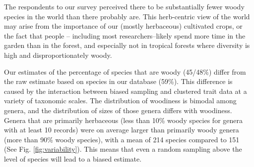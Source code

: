 The respondents to our survey perceived there to be substantially
fewer woody species in the world than there probably are.  This
herb-centric view of the world may arise from the importance of our
(mostly herbaceous) cultivated crops, or the fact that people --
including most researchers--likely spend more time in the garden than in
the forest, and especially not in tropical forests where diversity is high and disproportionately woody.

Our estimates of the percentage of species that are woody (45/48\%)
differ from the raw estimate based on species in our database (59\%).
This difference is caused by the interaction between biased sampling
and clustered trait data at a variety of taxonomic scales.
The distribution of woodiness is bimodal among genera, and the
distribution of sizes of those genera differs with woodiness.  Genera
that are primarily herbaceous (less than 10\% woody species for genera
with at least 10 records) were on average larger than primarily woody
genera (more than 90\% woody species), with a mean of 214 species
compared to 151 (See Fig. \ref{fig:variability}).
This means that even a random sampling above the level of species will
lead to a biased estimate.

